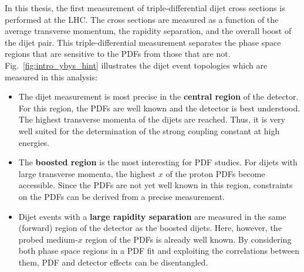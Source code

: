 In this thesis, the first measurement of triple-differential dijet cross
sections is performed at the LHC. The cross sections are measured as a function
of the average transverse momentum, the rapidity separation, and the overall
boost of the dijet pair. This triple-differential measurement separates the phase
space regions that are sensitive to the PDFs from those that are not.
Fig.~\ref{fig:intro_ybys_hint} illustrates the dijet event topologies which are
measured in this analysis:
%
\begin{itemize}
\setlength\itemsep{-3pt}
    \item The dijet measurement is most precise in the \textbf{central region}
        of the detector. For this region, the PDFs are well known and the
        detector is best understood. The highest transverse momenta
        of the dijets are reached. Thus, it is very well suited for the determination
        of the strong coupling constant at high energies.
    \item The \textbf{boosted region} is the most interesting for PDF studies.
        For dijets with large transverse momenta, the highest $x$ of the proton
        PDFs become accessible. Since the PDFs are not yet well known in this region,
        constraints on the PDFs can be derived from a precise
        measurement.
      \item Dijet events with a \textbf{large rapidity separation} are measured
          in the same (forward) region of the detector as the boosted dijets.
          Here, however, the probed medium-$x$ region of the PDFs is already well
          known. By considering both phase space regions in a PDF fit and exploiting the
          correlations between them, PDF and detector effects
          can be disentangled.
\end{itemize}
\vspace{-10pt}
%
